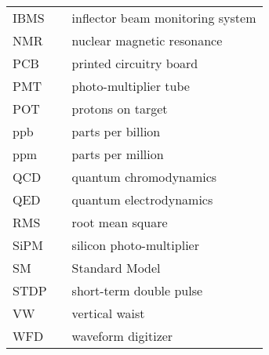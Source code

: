 {\begin{center}
\begin{tabular}{lll}
    IBMS & \dotfill & inflector beam monitoring system \\
    NMR & \dotfill & nuclear magnetic resonance \\
    PCB & \dotfill & printed circuitry board \\
    PMT  & \dotfill & photo-multiplier tube \\
    POT & \dotfill & protons on target \\
    ppb & \dotfill & parts per billion \\
    ppm & \dotfill & parts per million \\
    QCD & \dotfill & quantum chromodynamics \\
    QED & \dotfill & quantum electrodynamics \\
    RMS & \dotfill & root mean square \\
    SiPM & \dotfill & silicon photo-multiplier \\
    SM & \dotfill & Standard Model \\
    STDP & \dotfill & short-term double pulse \\
    VW & \dotfill & vertical waist \\
    WFD & \dotfill & waveform digitizer \\

  \end{tabular}
\end{center}
\cleardoublepage

} %


\newpage
\endofprelim
